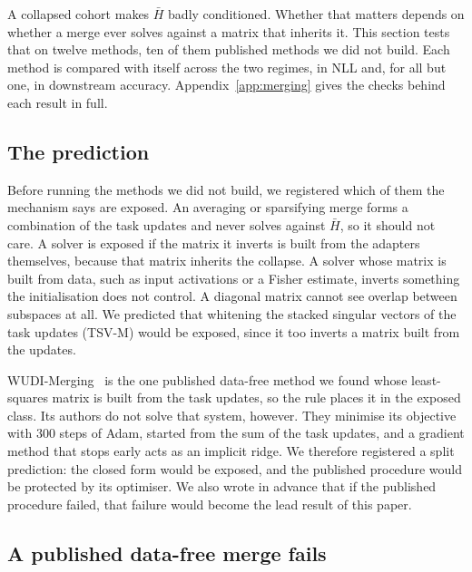 A collapsed cohort makes $\bar H$ badly conditioned. Whether that matters
depends on whether a merge ever solves against a matrix that inherits it. This
section tests that on twelve methods, ten of them published methods we did
not build. Each method is compared with itself across the two regimes, in NLL
and, for all but one, in downstream accuracy. Appendix~\ref{app:merging}
gives the checks behind each result in full.

\subsection{The prediction}\label{subsec:prediction}

Before running the methods we did not build, we registered which of them the
mechanism says are exposed. An averaging or sparsifying merge forms a
combination of the task updates and never solves against $\bar H$, so it
should not care. A solver is exposed if the matrix it inverts is built from the
adapters themselves, because that matrix inherits the collapse. A solver whose
matrix is built from data, such as input activations or a Fisher estimate,
inverts something the initialisation does not control. A diagonal matrix
cannot see overlap between subspaces at all. We predicted that whitening the
stacked singular vectors of the task updates (TSV-M) would be exposed, since it
too inverts a matrix built from the updates.

WUDI-Merging~\citep{cheng2025wudi} is the one published data-free method we
found whose least-squares matrix is built from the task updates, so the rule
places it in the exposed class. Its authors do not solve that system, however.
They minimise its objective with $300$ steps of Adam, started from the sum of
the task updates, and a gradient method that stops early acts as an implicit
ridge. We therefore registered a split prediction: the closed form would be
exposed, and the published procedure would be protected by its optimiser. We
also wrote in advance that if the published procedure failed, that failure
would become the lead result of this paper.

\subsection{A published data-free merge fails}\label{subsec:wudi}

